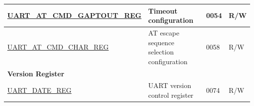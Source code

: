 \begin{longtable}{ | p{6cm} | p{7.2cm} | p{1.3cm} | p{1cm} | }
\hyperref[regdesc:UARTATCMDGAPTOUTREG]{UART\_AT\_CMD\_GAPTOUT\_REG} & Timeout configuration & \hexprefix{}0054 & R/W \\ \hline
\hyperref[regdesc:UARTATCMDCHARREG]{UART\_AT\_CMD\_CHAR\_REG} & AT escape sequence selection configuration & \hexprefix{}0058 & R/W \\ \hline
\multicolumn{4}{|l|}{\textbf{Version Register}} \\ \hline
\hyperref[regdesc:UARTDATEREG]{UART\_DATE\_REG} & UART version control register & \hexprefix{}0074 & R/W \\ \hline
\end{longtable}
